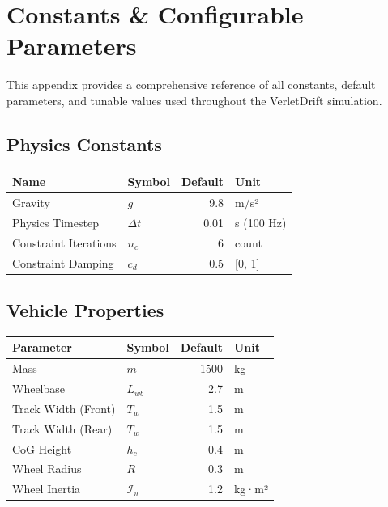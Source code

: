 \appendix

\section{Constants \& Configurable Parameters}

\label{sec:constants}

This appendix provides a comprehensive reference of all constants, default parameters, and tunable values used throughout the VerletDrift simulation.

\subsection{Physics Constants}

\begin{table}[H]
\centering
\begin{tabular}{|l|l|r|l|}
\hline
\textbf{Name} & \textbf{Symbol} & \textbf{Default} & \textbf{Unit} \\
\hline
Gravity & $g$ & 9.8 & m/s² \\
Physics Timestep & $\Delta t$ & 0.01 & s (100 Hz) \\
Constraint Iterations & $n_c$ & 6 & count \\
Constraint Damping & $c_d$ & 0.5 & [0, 1] \\
\hline
\end{tabular}
\end{table}

\subsection{Vehicle Properties}

\begin{table}[H]
\centering
\begin{tabular}{|l|l|r|l|}
\hline
\textbf{Parameter} & \textbf{Symbol} & \textbf{Default} & \textbf{Unit} \\
\hline
Mass & $m$ & 1500 & kg \\
Wheelbase & $L_{wb}$ & 2.7 & m \\
Track Width (Front) & $T_w$ & 1.5 & m \\
Track Width (Rear) & $T_w$ & 1.5 & m \\
CoG Height & $h_c$ & 0.4 & m \\
Wheel Radius & $R$ & 0.3 & m \\
Wheel Inertia & $\mathcal{I}_w$ & 1.2 & kg·m² \\
\hline
\end{tabular}
\end{table}

